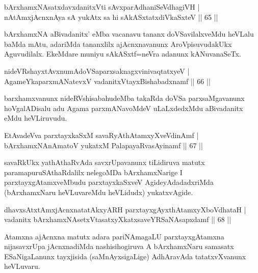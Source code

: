 \begin{shl}
bArxhamxNAsatxdavxdanitxVti sAvxparAdhaniSeVdhagiVH |\\
nA\s \s tAmxjAcnxnAya sA yukAtx sa hi sAkASxtatxdiVkaSxteV \hfill || 65 ||
\end{shl}

\begin{artha}
bArxhamxNA aBivadanitx' eMba vacanavu tananx doVSavilalxveMdu heVLalu baMda mAtu, adariMda tananxlilx ajAcnxnavanunx AroVpisuvudakUkx Aguvudilalx. EkeMdare muniyu sAkASxtf=neVra adanunx kANuvanaSeTx.
\end{artha}


\begin{shl}
nideVRshayxtAvxnumAdoVSaparxsaknagxvinivaqtatxyeV |\\
AgameYkaparxmANatevxV vadanitxVtayxBishabadxnamf \hfill || 66 ||
\end{shl}

\begin{artha}
barxhamxvanunx nideRVshisabahudeMba takaRda doVSa parxsaMgavanunx hoVgalADisalu adu Agama parxmANavoMdeV uLaLxdedxMdu aBivadanitx eMdu heVLiruvudu.
\end{artha}

\begin{shl}
EtAvadeVva parxtayxkaSxM savaRyAthAtamxyXveVdinAmf |\\
bArxhamxNAnAmatoV yukatxM PalapayaRvasAyinamf \hfill || 67 ||
\end{shl}

\begin{artha}
savaRkUkx yathAthaRvAda savxrUpavanunx tiLidiruva matutx paramapuruSAthaRdalilx nelegoMDa bArxhamxNarige I parxtayxgAtamxveMbudu parxtayxkaSxveV AgideyAdadadxriMda (bArxhamxNaru heVLuvareMdu heVLidudx) yukatxvAgide.
\end{artha}

\begin{shl}
dhavxsAtxtAmxjAcnxnatatAkxyARH parxtayxgAyxthAtamxyXboVdhataH |\\
vadanitx bArxhamxNAsetxV\s tasatxyXkatxsaveYRSaNAsapxdamf \hfill || 68 ||
\end{shl}

\begin{artha}
Atamxna ajAcnxna matutx adara pariNAmagaLU parxtayxgAtamxna nijasavxrUpa jAcnxnadiMda nashisihogiruva A bArxhamxNaru samasatx ESaNigaLanunx tayxjisida (saMnAyxsigaLige) AdhAravAda tatatxvXvanunx heVLuvaru.
\end{artha}

